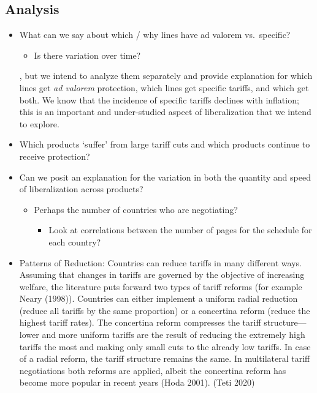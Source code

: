 \documentclass[
  12pt,
]{article}
\providecommand{\tightlist}{%
  \setlength{\itemsep}{0pt}\setlength{\parskip}{0pt}}
\begin{document}
\hypertarget{analysis}{%
\subsection{Analysis}\label{analysis}}

\begin{itemize}
\item
  What can we say about which / why lines have ad valorem vs.~specific?

  \begin{itemize}
  \tightlist
  \item
    Is there variation over time?
  \end{itemize}

  , but we intend to analyze them separately and provide explanation for which lines get \emph{ad valorem} protection, which lines get specific tariffs, and which get both. We know that the incidence of specific tariffs declines with inflation; this is an important and under-studied aspect of liberalization that we intend to explore.
\item
  Which products `suffer' from large tariff cuts and which products continue to receive protection?
\item
  Can we posit an explanation for the variation in both the quantity and speed of liberalization across products?

  \begin{itemize}
  \item
    Perhaps the number of countries who are negotiating?

    \begin{itemize}
    \tightlist
    \item
      Look at correlations between the number of pages for the schedule for each country?
    \end{itemize}
  \end{itemize}
\item
  Patterns of Reduction: Countries can reduce tariffs in many different ways. Assuming that changes in tariffs are governed by the objective of increasing welfare, the literature puts forward two types of tariff reforms (for example Neary (1998)). Countries can either implement a uniform radial reduction (reduce all tariffs by the same proportion) or a concertina reform (reduce the highest tariff rates). The concertina reform compresses the tariff structure---lower and more uniform tariffs are the result of reducing the extremely high tariffs the most and making only small cuts to the already low tariffs. In case of a radial reform, the tariff structure remains the same. In multilateral tariff negotiations both reforms are applied, albeit the concertina reform has become more popular in recent years (Hoda 2001). (Teti 2020)
\end{itemize}
\end{document}
